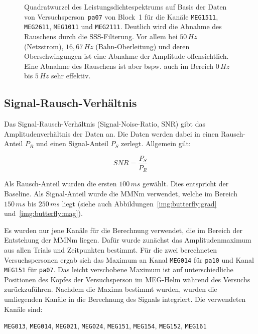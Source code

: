\documentclass[doc,a4paper,12pt]{apa6}
\begin{document}
\begin{figure}
\begin{subfigure}[c]{0.47\textwidth}
    \label{img:freq-analy-sss}
  \end{subfigure}
  \captionsetup{justification=justified}
  \vspace*{3mm}
  \caption[Leistungsdichtespektrum auf Basis eines Blocks]{Quadratwurzel des Leistungsdichtespektrums auf Basis der Daten von Versuchsperson~\texttt{pa07} von Block~1 für die Kanäle \texttt{MEG1511}, \texttt{MEG2611}, \texttt{MEG1011} und \texttt{MEG2111}. Deutlich wird die Abnahme des Rauschens durch die SSS-Filterung. Vor allem bei $50\,Hz$ (Netzstrom), $16,67\,Hz$ (Bahn-Oberleitung) und deren Oberschwingungen ist eine Abnahme der Amplitude offensichtlich. Eine Abnahme des Rauschens ist aber bspw. auch im Bereich $0\,Hz$ bis $5\,Hz$ sehr effektiv.}
  \label{img:freq-analy}
\end{figure}

\subsection{Signal-Rausch-Verhältnis}
\label{sec:snr}

Das Signal-Rausch-Verhältnis (Signal-Noise-Ratio, SNR) gibt das Amplitudenverhältnis der Daten an. Die Daten werden dabei in einen Rausch-Anteil $P_R$ und einen Signal-Anteil $P_S$ zerlegt. Allgemein gilt:

\begin{equation}
SNR = \frac{P_S}{P_R}
\end{equation}

Als Rausch-Anteil wurden die ersten $100\,ms$ gewählt. Dies entspricht der Baseline. Als Signal-Anteil wurde die MMNm verwendet, welche im Bereich $150\,ms$ bis $250\,ms$ liegt (siehe auch Abbildungen~\ref{img:butterfly:grad} und~\ref{img:butterfly:mag}).

Es wurden nur jene Kanäle für die Berechnung verwendet, die im Bereich der Entstehung der MMNm liegen. Dafür wurde zunächst das Amplitudenmaximum aus allen Trials und Zeitpunkten bestimmt. Für die zwei berechneten Versuchspersonen ergab sich das Maximum an Kanal \texttt{MEG014} für \texttt{pa10} und Kanal \texttt{MEG151} für \texttt{pa07}. Das leicht verschobene Maximum ist auf unterschiedliche Positionen des Kopfes der Versuchsperson im MEG-Helm während des Versuchs zurückzuführen. Nachdem die Maxima bestimmt wurden, wurden die umliegenden Kanäle in die Berechnung des Signals integriert. Die verwendeten Kanäle sind:

\texttt{MEG013}, \texttt{MEG014}, \texttt{MEG021}, \texttt{MEG024}, \texttt{MEG151}, \texttt{MEG154}, \texttt{MEG152}, \texttt{MEG161}
\end{document}
